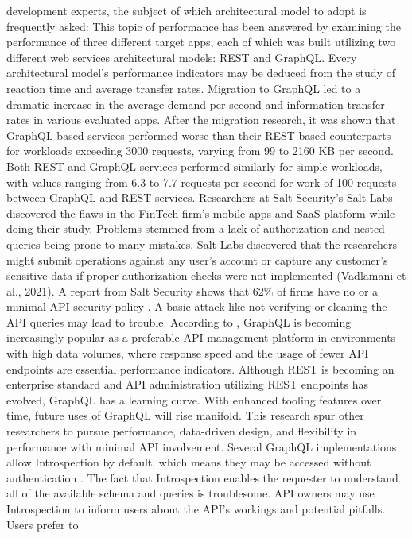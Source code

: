 development experts, the subject of which architectural model to adopt is
frequently asked: This topic of performance has been answered by examining the
performance of three different target apps, each of which was built utilizing
two different web services architectural models: REST and GraphQL. Every
architectural model's performance indicators may be deduced from the study of
reaction time and average transfer rates. Migration to GraphQL led to a dramatic
increase in the average demand per second and information transfer rates in
various evaluated apps. After the migration research, it was shown that
GraphQL-based services performed worse than their REST-based counterparts for
workloads exceeding 3000 requests, varying from 99 to 2160 KB per second. Both
REST and GraphQL services performed similarly for simple workloads, with values
ranging from 6.3 to 7.7 requests per second for work of 100 requests between
GraphQL and REST services. Researchers at Salt Security's Salt Labs discovered
the flaws in the FinTech firm's mobile apps and SaaS platform while doing their
study. Problems stemmed from a lack of authorization and nested queries being
prone to many mistakes. Salt Labs discovered that the researchers might submit
operations against any user's account or capture any customer's sensitive data
if proper authorization checks were not implemented (Vadlamani et al., 2021). A
report from Salt Security shows that 62\% of firms have no or a minimal
API security policy \citep{vadlamaniCanGraphQLReplace2021}. A basic attack like
not verifying or cleaning the API queries may lead to trouble. According to
\citet{britoRESTVsGraphQL2020}, GraphQL is becoming increasingly popular as a
preferable API management platform in environments with high data volumes, where
response speed and the usage of fewer API endpoints are essential performance
indicators. Although REST is becoming an enterprise standard and API
administration utilizing REST endpoints has evolved, GraphQL has a learning
curve. With enhanced tooling features over time, future uses of GraphQL will
rise manifold. This research spur other researchers to pursue performance,
data-driven design, and flexibility in performance with minimal API involvement.
Several GraphQL implementations allow Introspection by default, which means they
may be accessed without authentication \citep{eizingerAPIDesignDistributed2017}.
The fact that Introspection enables the requester to understand all of the
available schema and queries is troublesome. API owners may use Introspection to
inform users about the API's workings and potential pitfalls. Users prefer to
